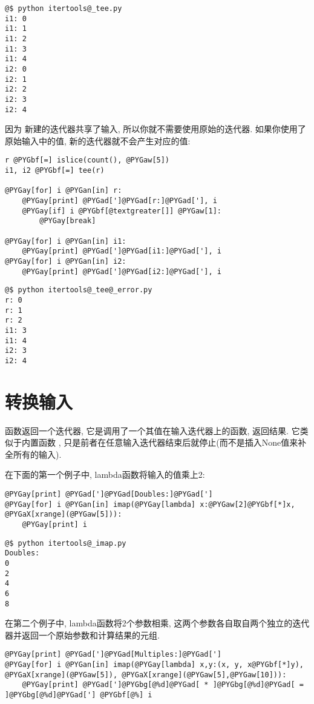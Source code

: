 \documentclass[a4paper,10pt,english]{manual}
\begin{document}
\begin{Verbatim}[commandchars=@\[\]]
@$ python itertools@_tee.py
i1: 0
i1: 1
i1: 2
i1: 3
i1: 4
i2: 0
i2: 1
i2: 2
i2: 3
i2: 4
\end{Verbatim}

因为  新建的迭代器共享了输入, 所以你就不需要使用原始的迭代器. 如果你使用了原始输入中的值, 新的迭代器就不会产生对应的值:

\begin{Verbatim}[commandchars=@\[\]]
r @PYGbf[=] islice(count(), @PYGaw[5])
i1, i2 @PYGbf[=] tee(r)

@PYGay[for] i @PYGan[in] r:
    @PYGay[print] @PYGad[']@PYGad[r:]@PYGad['], i
    @PYGay[if] i @PYGbf[@textgreater[]] @PYGaw[1]:
        @PYGay[break]

@PYGay[for] i @PYGan[in] i1:
    @PYGay[print] @PYGad[']@PYGad[i1:]@PYGad['], i
@PYGay[for] i @PYGan[in] i2:
    @PYGay[print] @PYGad[']@PYGad[i2:]@PYGad['], i
\end{Verbatim}

\begin{Verbatim}[commandchars=@\[\]]
@$ python itertools@_tee@_error.py
r: 0
r: 1
r: 2
i1: 3
i1: 4
i2: 3
i2: 4
\end{Verbatim}


\section{转换输入}

 函数返回一个迭代器, 它是调用了一个其值在输入迭代器上的函数, 返回结果. 它类似于内置函数  , 只是前者在任意输入迭代器结束后就停止(而不是插入None值来补全所有的输入).

在下面的第一个例子中, lambda函数将输入的值乘上2:

\begin{Verbatim}[commandchars=@\[\]]
@PYGay[print] @PYGad[']@PYGad[Doubles:]@PYGad[']
@PYGay[for] i @PYGan[in] imap(@PYGay[lambda] x:@PYGaw[2]@PYGbf[*]x, @PYGaX[xrange](@PYGaw[5])):
    @PYGay[print] i
\end{Verbatim}

\begin{Verbatim}[commandchars=@\[\]]
@$ python itertools@_imap.py
Doubles:
0
2
4
6
8
\end{Verbatim}

在第二个例子中, lambda函数将2个参数相乘, 这两个参数各自取自两个独立的迭代器并返回一个原始参数和计算结果的元组.

\begin{Verbatim}[commandchars=@\[\]]
@PYGay[print] @PYGad[']@PYGad[Multiples:]@PYGad[']
@PYGay[for] i @PYGan[in] imap(@PYGay[lambda] x,y:(x, y, x@PYGbf[*]y), @PYGaX[xrange](@PYGaw[5]), @PYGaX[xrange](@PYGaw[5],@PYGaw[10])):
    @PYGay[print] @PYGad[']@PYGbg[@%d]@PYGad[ * ]@PYGbg[@%d]@PYGad[ = ]@PYGbg[@%d]@PYGad['] @PYGbf[@%] i
\end{Verbatim}
\end{document}
